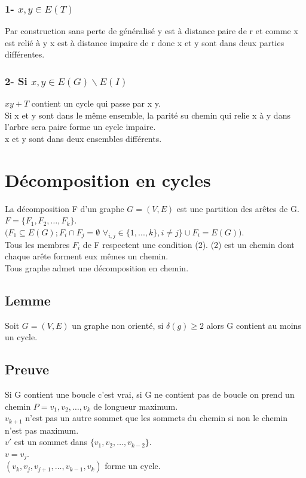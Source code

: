 \documentclass{article}
\begin{document}
\subsubsection*{1- $x,y \in E(T)$}
Par construction sans perte de généralisé y est à distance paire de r et comme x est relié à y x est à distance impaire de r donc x et y sont dans deux parties différentes.
\subsubsection*{2- Si $x,y \in E(G) \backslash E(I)$}
$xy + T$ contient un cycle qui passe par x y. \\
Si x et y sont dans le même ensemble, la parité su chemin qui relie x à y dans l’arbre sera paire  forme un cycle impaire. \\
x et y sont dans deux ensembles différents. 
\newpage
\section{Décomposition en cycles}
La décomposition F d’un graphe $G=(V,E)$ est une partition des arêtes de G. $ F=\{ F_1, F_2,…, F_k \}$. \\
$(F_1 \subseteq E(G); F_i \cap F_j = \emptyset$ $\forall_{i,j} \in \{1,...,k\}, i \neq j\} \cup F_i=E(G))$. \\
Tous les membres $F_i$ de F respectent une condition (2).
(2) est un chemin dont chaque arête forment eux mêmes un chemin. \\
Tous graphe admet une décomposition en chemin. \\
\subsection*{Lemme}
Soit $G=(V,E)$ un graphe non orienté, si $ \delta(g) \geq 2$ alors G contient au moins un cycle.
\subsection*{Preuve}
Si G contient une boucle c’est vrai, si G ne contient pas de boucle on prend un chemin $P=v_1,v_2,…,v_k$ de longueur maximum. \\
$v_{k+1}$ n’est pas un autre sommet que les sommets du chemin si non le chemin n’est pas maximum. \\
$v'$ est un sommet dans $\{v_{1},v_{2},…,v_{k-2}\}$. \\
$v=v_{j}$. \\
$(v_k,v_j,v_{j+1},…,v_{k-1},v_k)$ forme un cycle. \\
\\
\end{document}
